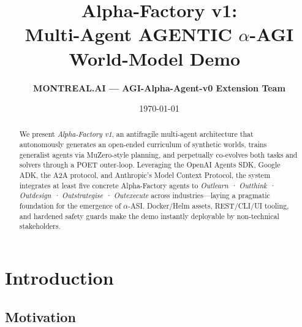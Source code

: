 \newtheorem{theorem}{Theorem}[section]
\newtheorem{lemma}{Lemma}[section]

\title{\bfseries Alpha-Factory v1:\\
  Multi-Agent AGENTIC \boldmath$\alpha$-AGI World-Model Demo
  \texorpdfstring{\,}{}}
\author{\textbf{MONTREAL.AI — AGI-Alpha-Agent-v0 Extension Team}}
\date{\today}

\usepackage[dvipsnames]{xcolor}
\usepackage{paralist}
\usepackage{algorithm}
\usepackage{algpseudocode}
\usetikzlibrary{positioning,calc}   %

\maketitle
\begin{abstract}\noindent
We present \emph{Alpha-Factory v1}, an antifragile multi-agent architecture
that autonomously generates an open-ended curriculum of synthetic worlds,
trains generalist agents via MuZero-style planning, and perpetually co-evolves
both tasks and solvers through a POET outer-loop.  Leveraging the OpenAI
Agents SDK, Google ADK, the \textsc{A2A} protocol, and Anthropic’s Model
Context Protocol, the system integrates at least five concrete Alpha-Factory
agents to \emph{Outlearn · Outthink · Outdesign · Outstrategise · Outexecute}
across industries—laying a pragmatic foundation for the emergence of
$\alpha$-ASI.  Docker/Helm assets, REST/CLI/UI tooling, and hardened safety
guards make the demo instantly deployable by non-technical stakeholders.
\end{abstract}

\tableofcontents
\newpage

\section{Introduction}\label{sec:intro}

\subsection{Motivation}

